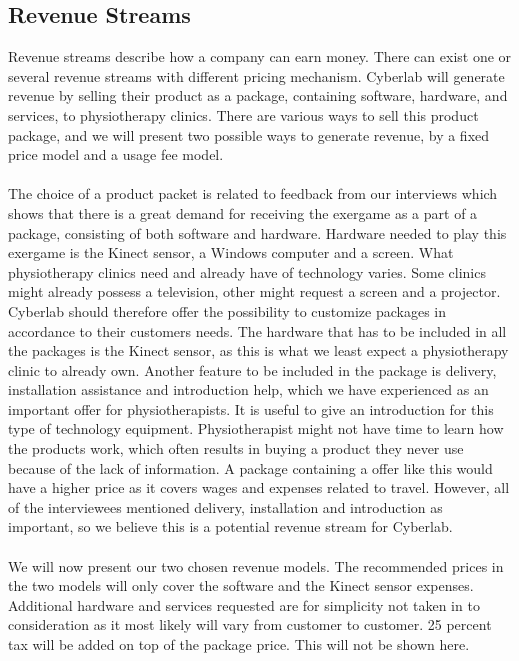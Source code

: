 \subsection{Revenue Streams}
Revenue streams describe how a company can earn money. There can exist one or several revenue streams with different pricing mechanism. Cyberlab will generate revenue by selling their product as a package, containing software, hardware, and services, to physiotherapy clinics. There are various ways to sell this product package, and we will present two possible ways to generate revenue, by a fixed price model and a usage fee model. \\ \\ 
The choice of a product packet is related to feedback from our interviews which shows that there is a great demand for receiving the exergame as a part of a package, consisting of both software and hardware. Hardware needed to play this exergame is the Kinect sensor, a Windows computer and a screen. What physiotherapy clinics need and already have of technology varies. Some clinics might already possess a television, other might request a screen and a projector. Cyberlab should therefore offer the possibility to customize packages in accordance to their customers needs. The hardware that has to be included in all the packages is the Kinect sensor, as this is what we least expect a physiotherapy clinic to already own. Another feature to be included in the package is delivery, installation assistance and introduction help, which we have experienced as an important offer for physiotherapists. It is useful to give an introduction for this type of technology equipment. Physiotherapist might not have time to learn how the products work, which often results in buying a product they never use because of the lack of information. A package containing a offer like this would have a higher price as it covers wages and expenses related to travel. However, all of the interviewees mentioned delivery, installation and introduction as important, so we believe this is a potential revenue stream for Cyberlab. \\ \\ 
We will now present our two chosen revenue models. The recommended prices in the two models will only cover the software and the Kinect sensor expenses. Additional hardware and services requested are for simplicity not taken in to consideration as it most likely will vary from customer to customer. 25 percent tax will be added on top of the package price. This will not be shown here.\\ \\
